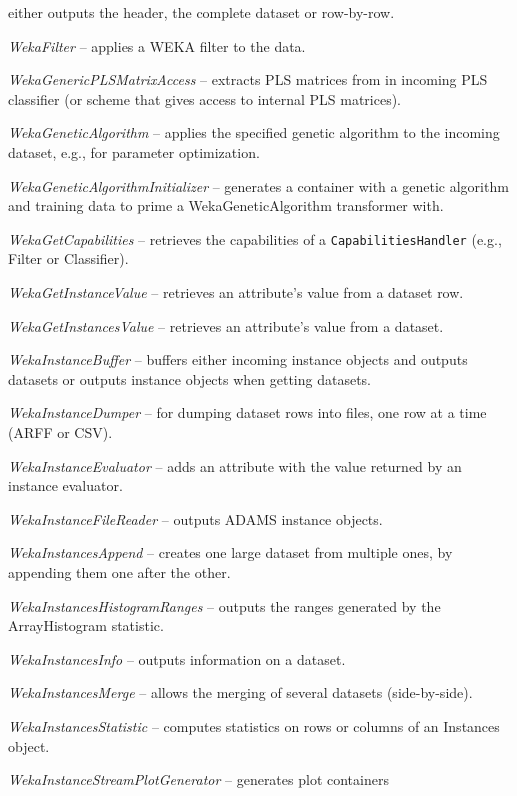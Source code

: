 \begin{tight_itemize}
	either outputs the header, the complete dataset or row-by-row.
	\item \textit{WekaFilter} -- applies a WEKA filter to the data.
	\item \textit{WekaGenericPLSMatrixAccess} -- extracts PLS matrices from in
	incoming PLS classifier (or scheme that gives access to internal PLS matrices).
	\item \textit{WekaGeneticAlgorithm} -- applies the specified genetic
	algorithm to the incoming dataset, e.g., for parameter optimization.
	\item \textit{WekaGeneticAlgorithmInitializer} -- generates a container
	with a genetic algorithm and training data to prime a WekaGeneticAlgorithm
	transformer with.
	\item \textit{WekaGetCapabilities} -- retrieves the capabilities of a
	\texttt{CapabilitiesHandler} (e.g., Filter or Classifier).
	\item \textit{WekaGetInstanceValue} -- retrieves an attribute's value from
	a dataset row.
	\item \textit{WekaGetInstancesValue} -- retrieves an attribute's value from
	a dataset.
	\item \textit{WekaInstanceBuffer} -- buffers either incoming instance 
	objects and outputs datasets or outputs instance objects when getting
	datasets.
	\item \textit{WekaInstanceDumper} -- for dumping dataset rows into files,
	one row at a time (ARFF or CSV).
	\item \textit{WekaInstanceEvaluator} -- adds an attribute with the value
	returned by an instance evaluator.
	\item \textit{WekaInstanceFileReader} -- outputs ADAMS instance objects.
	\item \textit{WekaInstancesAppend} -- creates one large dataset from 
	multiple ones, by appending them one after the other.
	\item \textit{WekaInstancesHistogramRanges} -- outputs the ranges generated by the
	ArrayHistogram statistic.
	\item \textit{WekaInstancesInfo} -- outputs information on a dataset.
	\item \textit{WekaInstancesMerge} -- allows the merging of several datasets 
	(side-by-side).
	\item \textit{WekaInstancesStatistic} -- computes statistics on rows
	or columns of an Instances object.
	\item \textit{WekaInstanceStreamPlotGenerator} -- generates plot containers

\end{tight_itemize}
